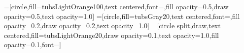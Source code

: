 \documentclass[fleqn,11pt,aspectratio=1610]{beamer}
\begin{document}
=[circle,fill=tubsLightOrange100,text centered,font=\tiny,fill
opacity=0.5,draw opacity=0.5,text opacity=1.0]
=[circle,fill=tubsGray20,text centered,font=\tiny,fill
opacity=0.2,draw opacity=0.2,text opacity=1.0]
=[circle split,draw,text centered,fill=tubsLightOrange20,draw opacity=0.1,text opacity=1.0,fill opacity=0.1,font=\tiny]


\newcommand{\fitnode}[3]{%
  \ifthenelse
  {#3 = 47 \OR #3 = 49 \OR #3 = 51 \OR #3 = 53 \OR #3 = 57 \OR #3 = 59 \OR #3 = 83 \OR #3 = 85 \OR #3 = 87 \OR #3 = 89 \OR #3 = 91 \OR #3 = 93 \OR #3 = 95 \OR #3 = 123 \OR #3 = 127 \OR #3 = 131 \OR #3 = 133 \OR #3 = 151 \OR #3 = 153 \OR #3 = 155 \OR #3 = 157 \OR #3 = 159 \OR #3 = 161 \OR #3 = 192 \OR #3 = 194 \OR #3 = 196 \OR #3 = 198 \OR #3 = 200 \OR #3 = 202 \OR #3 = 204 \OR #3 = 218 \OR #3 = 220 \OR #3 = 222 \OR #3 = 224 \OR #3 = 226 \OR #3 = 228 \OR #3 = 230 \OR #3 = 244 \OR #3 = 246 \OR #3 = 248 \OR #3 = 250 \OR #3 = 252 \OR #3 = 254 \OR #3 = 256}%
  {\node at (#1,#2) [cnode] {#3};}
  {\node at (#1,#2) [snode] {#3};}
}
\end{document}
